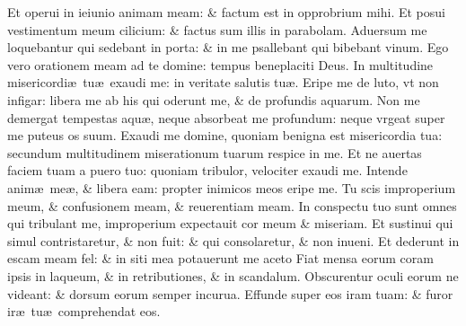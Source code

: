\documentclass[a5paper,10pt]{book}
\def\ae{æ}
\begin{document}
\begin{multicols*}{2}
\newline \color{red} E\color{black}t operui in ieiunio animam meam: \& factum est in opprobrium mihi.
\newline \color{red} E\color{black}t posui vestimentum meum cilicium: \& factus sum illis in parabolam.
\newline \color{red} A\color{black}duersum me loquebantur qui sedebant in porta: \& in me psallebant qui bibebant vinum.
\newline \color{red} E\color{black}go vero orationem meam ad te domine: tempus beneplaciti Deus.
\newline \color{red} I\color{black}n multitudine misericordi\ae \ tu\ae \ exaudi me: in veritate salutis tu\ae .
\newline \color{red} E\color{black}ripe me de luto, vt non infigar: libera me ab his qui oderunt me, \& de profundis aquarum.
\newline \color{red} N\color{black}on me demergat tempestas aqu\ae , neque absorbeat me profundum: neque vrgeat super me puteus os suum.
\newline \color{red} E\color{black}xaudi me domine, quoniam benigna est misericordia tua: secundum multitudinem miserationum tuarum respice in me.
\newline \color{red} E\color{black}t ne auertas faciem tuam a puero tuo: quoniam tribulor, velociter exaudi me.
\newline \color{red} I\color{black}ntende anim\ae \ me\ae , \& libera eam: propter inimicos meos eripe me.
\newline \color{red} T\color{black}u scis improperium meum, \& confusionem meam, \& reuerentiam meam.
\newline \color{red} I\color{black}n conspectu tuo sunt omnes qui tribulant me, improperium expectauit cor meum \& miseriam.
\newline \color{red} E\color{black}t sustinui qui simul contristaretur, \& non fuit: \& qui consolaretur, \& non inueni.
\newline \color{red} E\color{black}t dederunt in escam meam fel: \& in siti mea potauerunt me aceto
\newline \color{red} F\color{black}iat mensa eorum coram ipsis in laqueum, \& in retributiones, \& in scandalum.
\newline \color{red} O\color{black}bscurentur oculi eorum ne videant: \& dorsum eorum semper incurua.
\newline \color{red} E\color{black}ffunde super eos iram tuam: \& furor ir\ae \ tu\ae \ comprehendat eos.

\end{multicols*}
\end{document}
